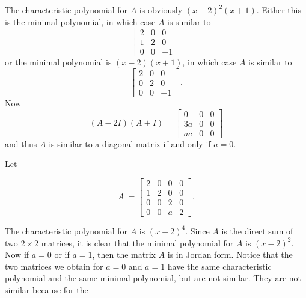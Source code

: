 The characteristic polynomial for \(A\) is obviously \((x-2)^{2}(x+1)\). Either this is the minimal polynomial, in which case \(A\) is similar to \[\begin{bmatrix}2&0&0\\ 1&2&0\\ 0&0&-1\end{bmatrix}\] or the minimal polynomial is \((x-2)(x+1)\), in which case \(A\) is similar to \[\begin{bmatrix}2&0&0\\ 0&2&0\\ 0&0&-1\end{bmatrix}.\] Now \[(A-2I)(A+I)=\begin{bmatrix}0&0&0\\ 3a&0&0\\ ac&0&0\end{bmatrix}\] and thus \(A\) is similar to a diagonal matrix if and only if \(a=0\).

Let

\[A\ =\begin{bmatrix}2&0&0&0\\ 1&2&0&0\\ 0&0&2&0\\ 0&0&a&2\end{bmatrix}.\]

The characteristic polynomial for \(A\) is \((x-2)^{4}\). Since \(A\) is the direct sum of two \(2\times 2\) matrices, it is clear that the minimal polynomial for \(A\) is \((x-2)^{2}\). Now if \(a=0\) or if \(a=1\), then the matrix \(A\) is in Jordan form. Notice that the two matrices we obtain for \(a=0\) and \(a=1\) have the same characteristic polynomial and the same minimal polynomial, but are not similar. They are not similar because for the 